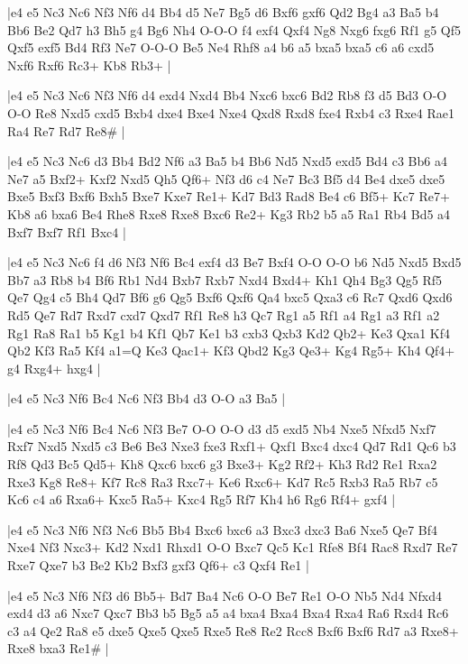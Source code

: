 \whitename{}
\blackname{}
\makegametitle
|e4 e5 Nc3 Nc6 Nf3 Nf6 d4 Bb4 d5 Ne7 Bg5 d6 Bxf6 gxf6 Qd2 Bg4 a3 Ba5 b4 Bb6 Be2 Qd7 h3 Bh5 g4 Bg6 Nh4 O-O-O f4 exf4 Qxf4 Ng8 Nxg6 fxg6 Rf1 g5 Qf5 Qxf5 exf5 Bd4 Rf3 Ne7 O-O-O Be5 Ne4 Rhf8 a4 b6 a5 bxa5 bxa5 c6 a6 cxd5 Nxf6 Rxf6 Rc3+ Kb8 Rb3+  |

\whitename{}
\blackname{}
\makegametitle
|e4 e5 Nc3 Nc6 Nf3 Nf6 d4 exd4 Nxd4 Bb4 Nxc6 bxc6 Bd2 Rb8 f3 d5 Bd3 O-O O-O Re8 Nxd5 cxd5 Bxb4 dxe4 Bxe4 Nxe4 Qxd8 Rxd8 fxe4 Rxb4 c3 Rxe4 Rae1 Ra4 Re7 Rd7 Re8\#  |

\whitename{}
\blackname{}
\makegametitle
|e4 e5 Nc3 Nc6 d3 Bb4 Bd2 Nf6 a3 Ba5 b4 Bb6 Nd5 Nxd5 exd5 Bd4 c3 Bb6 a4 Ne7 a5 Bxf2+ Kxf2 Nxd5 Qh5 Qf6+ Nf3 d6 c4 Ne7 Bc3 Bf5 d4 Be4 dxe5 dxe5 Bxe5 Bxf3 Bxf6 Bxh5 Bxe7 Kxe7 Re1+ Kd7 Bd3 Rad8 Be4 c6 Bf5+ Kc7 Re7+ Kb8 a6 bxa6 Be4 Rhe8 Rxe8 Rxe8 Bxc6 Re2+ Kg3 Rb2 b5 a5 Ra1 Rb4 Bd5 a4 Bxf7 Bxf7 Rf1 Bxc4  |

\whitename{}
\blackname{}
\makegametitle
|e4 e5 Nc3 Nc6 f4 d6 Nf3 Nf6 Bc4 exf4 d3 Be7 Bxf4 O-O O-O b6 Nd5 Nxd5 Bxd5 Bb7 a3 Rb8 b4 Bf6 Rb1 Nd4 Bxb7 Rxb7 Nxd4 Bxd4+ Kh1 Qh4 Bg3 Qg5 Rf5 Qe7 Qg4 c5 Bh4 Qd7 Bf6 g6 Qg5 Bxf6 Qxf6 Qa4 bxc5 Qxa3 c6 Rc7 Qxd6 Qxd6 Rd5 Qe7 Rd7 Rxd7 cxd7 Qxd7 Rf1 Re8 h3 Qc7 Rg1 a5 Rf1 a4 Rg1 a3 Rf1 a2 Rg1 Ra8 Ra1 b5 Kg1 b4 Kf1 Qb7 Ke1 b3 cxb3 Qxb3 Kd2 Qb2+ Ke3 Qxa1 Kf4 Qb2 Kf3 Ra5 Kf4 a1=Q Ke3 Qac1+ Kf3 Qbd2 Kg3 Qe3+ Kg4 Rg5+ Kh4 Qf4+ g4 Rxg4+ hxg4  |

\whitename{}
\blackname{}
\makegametitle
|e4 e5 Nc3 Nf6 Bc4 Nc6 Nf3 Bb4 d3 O-O a3 Ba5  |

\whitename{}
\blackname{}
\makegametitle
|e4 e5 Nc3 Nf6 Bc4 Nc6 Nf3 Be7 O-O O-O d3 d5 exd5 Nb4 Nxe5 Nfxd5 Nxf7 Rxf7 Nxd5 Nxd5 c3 Be6 Be3 Nxe3 fxe3 Rxf1+ Qxf1 Bxc4 dxc4 Qd7 Rd1 Qc6 b3 Rf8 Qd3 Bc5 Qd5+ Kh8 Qxc6 bxc6 g3 Bxe3+ Kg2 Rf2+ Kh3 Rd2 Re1 Rxa2 Rxe3 Kg8 Re8+ Kf7 Rc8 Ra3 Rxc7+ Ke6 Rxc6+ Kd7 Rc5 Rxb3 Ra5 Rb7 c5 Kc6 c4 a6 Rxa6+ Kxc5 Ra5+ Kxc4 Rg5 Rf7 Kh4 h6 Rg6 Rf4+ gxf4  |

\whitename{}
\blackname{}
\makegametitle
|e4 e5 Nc3 Nf6 Nf3 Nc6 Bb5 Bb4 Bxc6 bxc6 a3 Bxc3 dxc3 Ba6 Nxe5 Qe7 Bf4 Nxe4 Nf3 Nxc3+ Kd2 Nxd1 Rhxd1 O-O Bxc7 Qc5 Kc1 Rfe8 Bf4 Rac8 Rxd7 Re7 Rxe7 Qxe7 b3 Be2 Kb2 Bxf3 gxf3 Qf6+ c3 Qxf4 Re1  |

\whitename{}
\blackname{}
\makegametitle
|e4 e5 Nc3 Nf6 Nf3 d6 Bb5+ Bd7 Ba4 Nc6 O-O Be7 Re1 O-O Nb5 Nd4 Nfxd4 exd4 d3 a6 Nxc7 Qxc7 Bb3 b5 Bg5 a5 a4 bxa4 Bxa4 Bxa4 Rxa4 Ra6 Rxd4 Rc6 c3 a4 Qe2 Ra8 e5 dxe5 Qxe5 Qxe5 Rxe5 Re8 Re2 Rcc8 Bxf6 Bxf6 Rd7 a3 Rxe8+ Rxe8 bxa3 Re1\#  |

